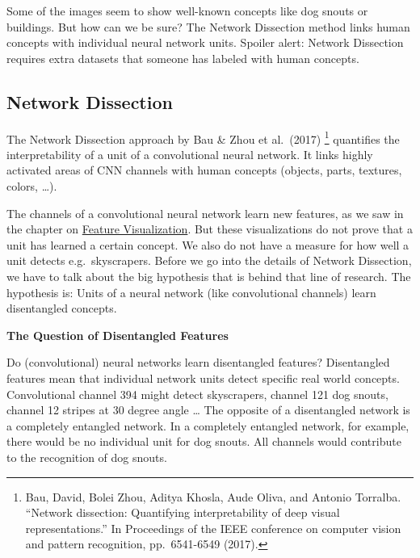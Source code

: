 \documentclass[
  11pt,
]{scrbook}
\begin{document}
Some of the images seem to show well-known concepts like dog snouts or buildings.
But how can we be sure?
The Network Dissection method links human concepts with individual neural network units.
Spoiler alert: Network Dissection requires extra datasets that someone has labeled with human concepts.

\hypertarget{network-dissection}{%
\subsection{Network Dissection}\label{network-dissection}}

The Network Dissection approach by Bau \& Zhou et al.~(2017) \footnote{Bau, David, Bolei Zhou, Aditya Khosla, Aude Oliva, and Antonio Torralba. ``Network dissection: Quantifying interpretability of deep visual representations.'' In Proceedings of the IEEE conference on computer vision and pattern recognition, pp.~6541-6549 (2017).} quantifies the interpretability of a unit of a convolutional neural network.
It links highly activated areas of CNN channels with human concepts (objects, parts, textures, colors, \ldots).

The channels of a convolutional neural network learn new features, as we saw in the chapter on \protect\hyperlink{feature-visualization}{Feature Visualization}.
But these visualizations do not prove that a unit has learned a certain concept.
We also do not have a measure for how well a unit detects e.g.~skyscrapers.
Before we go into the details of Network Dissection, we have to talk about the big hypothesis that is behind that line of research.
The hypothesis is:
Units of a neural network (like convolutional channels) learn disentangled concepts.

\textbf{The Question of Disentangled Features}

Do (convolutional) neural networks learn disentangled features?
Disentangled features mean that individual network units detect specific real world concepts.
Convolutional channel 394 might detect skyscrapers, channel 121 dog snouts, channel 12 stripes at 30 degree angle \ldots{}
The opposite of a disentangled network is a completely entangled network.
In a completely entangled network, for example, there would be no individual unit for dog snouts.
All channels would contribute to the recognition of dog snouts.
\end{document}
